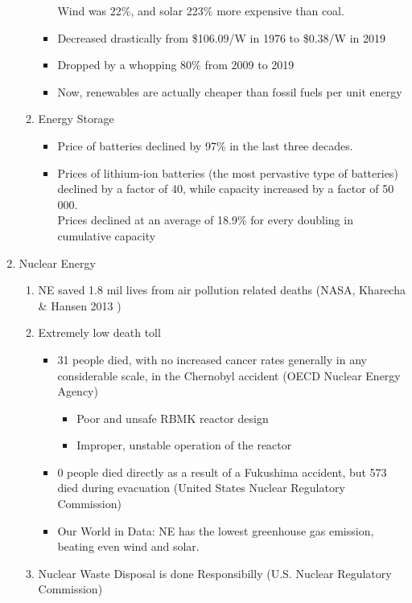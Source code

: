 \documentclass[oneside]{book}
\begin{document}
\begin{enumerate}
\begin{enumerate}
\begin{itemize}
            Wind was 22\%, and solar 223\% more expensive than coal.
            \item  Decreased drastically from \$106.09/W in 1976 to \$0.38/W in 2019
            \item Dropped by a whopping 80\% from 2009 to 2019
            \item Now, renewables are actually cheaper than fossil fuels per unit energy
        \end{itemize} 
        \item Energy Storage
        \begin{itemize}
            \item Price of batteries declined by 97\% in the last three decades.
            \item Prices of lithium-ion batteries \footnotesize (the most pervastive type of batteries) \normalsize declined by a factor of 40, while capacity increased by a factor of 50 000.\\[2mm]
            Prices declined at an average of 18.9\% for every doubling in cumulative capacity
        \end{itemize}
    \end{enumerate}
    \item Nuclear Energy 
    \begin{enumerate}
        \item NE saved 1.8 mil lives from air pollution related deaths (NASA, Kharecha \& Hansen 2013
        )
        \item Extremely low death toll \begin{itemize}
            \item 31 people died, with no increased cancer rates generally in any considerable scale, in the Chernobyl accident (OECD Nuclear Energy Agency) \begin{itemize}
                \item Poor and unsafe RBMK reactor design
                \item Improper, unstable operation of the reactor 
            \end{itemize}
            \item 0 people died directly as a result of a Fukushima accident, but 573 died during evacuation (United States Nuclear Regulatory Commission)
            \item Our World in Data: NE has the lowest greenhouse gas emission, beating even wind and solar.
        \end{itemize}
        \item Nuclear Waste Disposal is done Responsibilly (U.S. Nuclear Regulatory Commission) \begin{itemize}

\end{itemize}
\end{enumerate}
\end{enumerate}
\end{document}
